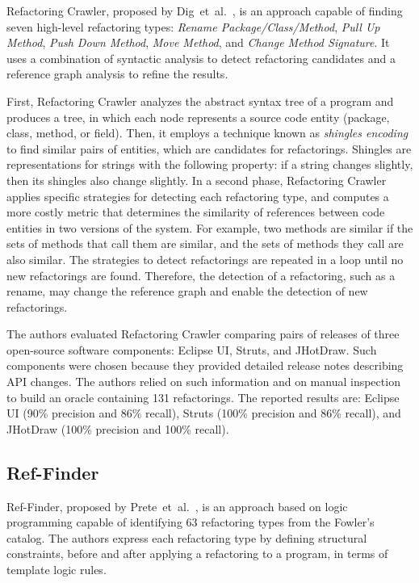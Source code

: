 \documentclass[10pt,journal,compsoc]{IEEEtran}
\begin{document}
Refactoring Crawler, proposed by Dig~et~al.~\cite{dig2006automated}, is an approach capable of finding seven high-level refactoring types: \emph{Rename Package/Class/Method}, \emph{Pull Up Method}, \emph{Push Down Method}, \emph{Move Method}, and \emph{Change Method Signature}.
It uses a combination of syntactic analysis to detect refactoring candidates and a reference graph analysis to refine the results.

First, Refactoring Crawler analyzes the abstract syntax tree of a program and produces a tree, in which each node represents a source code entity (package, class, method, or field).
Then, it employs a technique known as \emph{shingles encoding} to find 
similar pairs of entities, which are candidates for refactorings.
Shingles are representations for strings with the following property: if a string changes slightly, then its shingles also change slightly.
In a second phase, Refactoring Crawler applies specific strategies for detecting each refactoring type, and computes a more costly metric that determines the similarity of references between code entities in two versions of the system. For example, two methods are similar if the sets of methods that call them are similar, and the sets of methods they call are also similar.
The strategies to detect refactorings are repeated in a loop until no new refactorings are found. Therefore, the detection of a refactoring, such as a rename, may change the reference graph and enable the detection of new refactorings.

The authors evaluated Refactoring Crawler comparing pairs of releases of three open-source software components: Eclipse UI, Struts, and JHotDraw. Such components were chosen because they provided detailed release notes describing API changes. The authors relied on such information and on manual inspection to build an oracle
containing 131 refactorings.
The reported results are: Eclipse UI (90\% precision and 86\% recall), Struts (100\% precision and 86\% recall), and JHotDraw (100\% precision and 100\% recall).


\subsection{Ref-Finder}

Ref-Finder, proposed by Prete~et~al.~\cite{prete2010template,Kim:2010:RefFinder}, is an approach based on logic programming capable of identifying 63 refactoring types from the Fowler's catalog\cite{Fowler:1999}.
The authors express each refactoring type by defining structural constraints, before and after applying a refactoring to a program, in terms of template logic rules.
\end{document}
